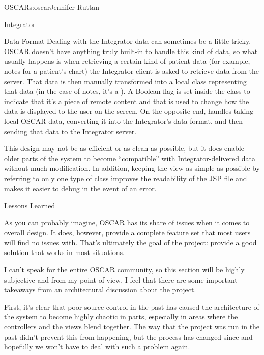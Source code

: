 \begin{aosachapter}{OSCAR}{s:oscar}{Jennifer Ruttan}
\begin{aosasect1}{Integrator}
\begin{aosasect2}{Data Format}
Dealing with the Integrator data can sometimes be a little
tricky. OSCAR doesn't have anything truly built-in to handle this kind
of data, so what usually happens is when retrieving a certain
kind of patient data (for example, notes for a patient's chart) the
Integrator client is asked to retrieve data from the server. That data
is then manually transformed into a local class representing that data
(in the case of notes, it's a ). A Boolean flag is
set inside the class to indicate that it's a piece of remote content
and that is used to change how the data is displayed to the user on
the screen. On the opposite end,  handles taking local
OSCAR data, converting it into the Integrator's data format, and then
sending that data to the Integrator server.

This design may not be as efficient or as clean as possible, but it
does enable older parts of the system to become ``compatible'' with
Integrator-delivered data without much modification. In addition,
keeping the view as simple as possible by referring to only one type
of class improves the readability of the JSP file and makes it easier
to debug in the event of an error.

\end{aosasect2}

\end{aosasect1}

\begin{aosasect1}{Lessons Learned}

As you can probably imagine, OSCAR has its share of issues when it
comes to overall design. It does, however, provide a complete feature
set that most users will find no issues with. That's ultimately the
goal of the project: provide a good solution that works in most
situations.

I can't speak for the entire OSCAR community, so this section will be
highly subjective and from my point of view. I feel that there are
some important takeaways from an architectural discussion about the
project.

First, it's clear that poor source control in the past has caused the
architecture of the system to become highly chaotic in parts,
especially in areas where the controllers and the views blend
together. The way that the project was run in the past didn't prevent
this from happening, but the process has changed since and hopefully
we won't have to deal with such a problem again.


\end{aosasect1}
\end{aosachapter}
